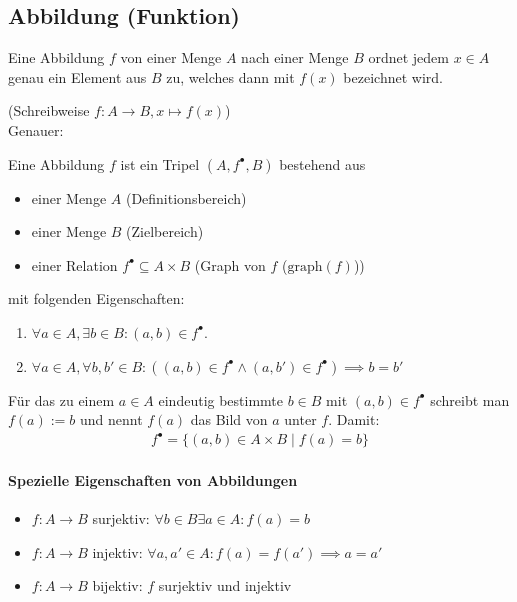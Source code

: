 \subsection{Abbildung (Funktion)}
\begin{definition*}
	Eine Abbildung $f$ von einer Menge $A$ nach einer Menge $B$ ordnet jedem $x \in A$ genau ein Element aus $B$ zu, welches dann mit $f(x)$ bezeichnet wird.
\end{definition*}
(Schreibweise $f:A \to B, x \mapsto f(x)$)\\
Genauer:
\begin{definition}
	Eine Abbildung $f$ ist ein Tripel $(A,f^{\bullet}, B)$ bestehend aus
	\begin{itemize}
		\item einer Menge $A$ (Definitionsbereich)
		\item einer Menge $B$ (Zielbereich)
		\item einer Relation $f^{\bullet}\subseteq A \times B$ (Graph von $f$
		      ($\mathrm{graph}(f)$))
	\end{itemize}
	mit folgenden Eigenschaften:
	\begin{enumerate}
		\item $\forall a\in A, \exists b\in B: (a,b)\in f^{\bullet}$.
		\item $\forall a \in A, \forall b, b' \in B: ((a,b)\in f^{\bullet} \land (a,b')\in f^{\bullet}) \implies b=b'$
	\end{enumerate}
\end{definition}
Für das zu einem $a \in A$ eindeutig bestimmte $b\in B$ mit $(a,b)\in f^{\bullet}$ schreibt man $f(a):=b$ und nennt $f(a)$ das Bild von $a$ unter $f$. Damit:
\begin{align*}
	f^{\bullet}=\{(a,b)\in A \times B\mid f(a)=b\}
\end{align*}
\paragraph{Spezielle Eigenschaften von Abbildungen}
\begin{itemize}
	\item $f:A\to B$ surjektiv: $\forall b \in B \exists a \in A: f(a)=b$
	\item $f:A\to B$ injektiv: $\forall a, a' \in A: f(a)=f(a')\implies a = a'$
	\item $f:A\to B$ bijektiv: $f$ surjektiv und injektiv
\end{itemize}

